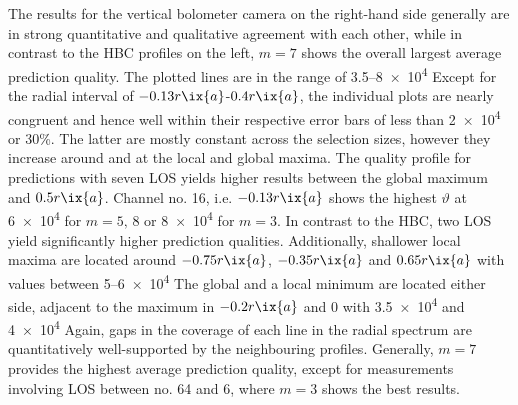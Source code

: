%
                The results for the vertical bolometer camera on the right-hand side generally are in strong quantitative and qualitative agreement with each other, while in contrast to the HBC profiles on the left, $m=7$ shows the overall largest average prediction quality. The plotted lines are in the range of \SIrange{3.5}{8e4}{\arbitraryunit} Except for the radial interval of $-0.13r\ix{a}$-$0.4r\ix{a}$, the individual plots are nearly congruent and hence well within their respective error bars of less than \SI{2e4}{\arbitraryunit} or 30\%. The latter are mostly constant across the selection sizes, however they increase around and at the local and global maxima. The quality profile for predictions with seven LOS yields higher results between the global maximum and $0.5r\ix{a}$. Channel no. 16, i.e. $-0.13r\ix{a}$ shows the highest $\vartheta$ at \SI{6e4}{\arbitraryunit} for $m=5,\,8$ or \SI{8e4}{\arbitraryunit} for $m=3$. In contrast to the HBC, two LOS yield significantly higher prediction qualities. Additionally, shallower local maxima are located around $-0.75r\ix{a}$, $-0.35r\ix{a}$ and $0.65r\ix{a}$ with values between \SIrange{5}{6e4}{\arbitraryunit} The global and a local minimum are located either side, adjacent to the maximum in $-0.2r\ix{a}$ and $0$ with \SI{3.5e4}{\arbitraryunit} and \SI{4e4}{\arbitraryunit} Again, gaps in the coverage of each line in the radial spectrum are quantitatively well-supported by the neighbouring profiles. Generally, $m=7$ provides the highest average prediction quality, except for measurements involving LOS between no. 64 and 6, where $m=3$ shows the best results.\\%
